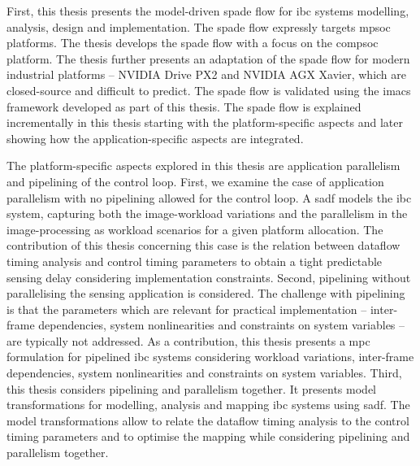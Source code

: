 First, this thesis presents the model-driven \gls{spade} flow for \gls{ibc} systems modelling, analysis, design and implementation.  The \gls{spade} flow expressly targets \gls{mpsoc} platforms. The thesis develops the \gls{spade} flow with a focus on the \gls{compsoc} platform. The thesis further presents an adaptation of the \gls{spade} flow for modern industrial platforms – NVIDIA Drive PX2 and NVIDIA AGX Xavier, which are closed-source and difficult to predict. The \gls{spade} flow is validated using the \gls{imacs} framework developed as part of this thesis.
The \gls{spade} flow is explained incrementally in this thesis starting with the platform-specific aspects and later showing how the application-specific aspects are integrated.   

The platform-specific aspects explored in this thesis are application parallelism and pipelining of the control loop. First, we examine the case of application parallelism with no pipelining allowed for the control loop. A \gls{sadf} models the \gls{ibc} system, capturing both the image-workload variations and the parallelism in the image-processing as workload scenarios for a given platform allocation. The contribution of this thesis concerning this case is the relation between dataflow timing analysis and control timing parameters to obtain a tight predictable sensing delay considering implementation constraints. Second, pipelining without parallelising the sensing application is considered. The challenge with pipelining is that the parameters which are relevant for practical implementation – inter-frame dependencies, system nonlinearities and constraints on system variables – are typically not addressed. As a contribution, this thesis presents a \gls{mpc} formulation for pipelined \gls{ibc} systems considering workload variations, inter-frame dependencies, system nonlinearities and constraints on system variables. Third, this thesis considers pipelining and parallelism together. It presents model transformations for modelling, analysis and mapping \gls{ibc} systems using \gls{sadf}. The model transformations allow to relate the dataflow timing analysis to the control timing parameters and to optimise the mapping while considering pipelining and parallelism together. 

